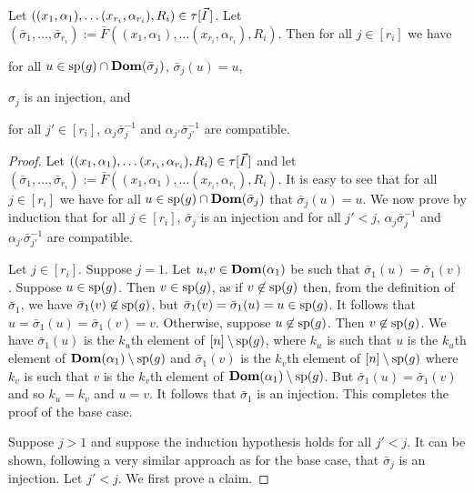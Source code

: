 \documentclass[../main/thesis.tex]{subfiles}
\begin{document}
\begin{lem}
  Let $((x_1, \alpha_1), \ldots (x_{r_i}, \alpha_{r_i}), R_i) \in
  \tau[\vec{I} \,]$. Let $(\bar{\sigma}_1, \ldots, \bar{\sigma}_{r_i})
  := \bar{F}((x_1, \alpha_1), \ldots (x_{r_i}, \alpha_{r_i}), R_i)$. Then for
  all $j \in [r_i]$ we have
  \begin{myenum}
  \item for all $u \in \text{sp}(g) \cap \text{\textbf{Dom}} (\bar{\sigma}_j)$, $\bar{\sigma}_j
    (u) = u$,
  \item $\sigma_j$ is an injection, and
  \item for all $j' \in [r_i]$, $\alpha_j \bar{\sigma}^{-1}_j$ and $\alpha_{j'}
    \bar{\sigma}^{-1}_{j'}$ are compatible.
  \end{myenum}
\end{lem}
\begin{proof}
  Let $((x_1, \alpha_1), \ldots (x_{r_i}, \alpha_{r_i}), R_i) \in
  \tau[\vec{I} \,]$ and let $(\bar{\sigma}_1, \ldots,
  \bar{\sigma}_{r_i}) := \bar{F}((x_1, \alpha_1), \ldots (x_{r_i},
  \alpha_{r_i}), R_i)$. It is easy to see that for all $j \in [r_i]$ we have for
  all $u \in \text{sp}(g) \cap \text{\textbf{Dom}} (\bar{\sigma}_j)$ that $\bar{\sigma}_j (u) =
  u$. We now prove by induction that for all $j \in [r_i]$, $\bar{\sigma}_j$ is
  an injection and for all $j' < j$, $\alpha_j \bar{\sigma}^{-1}_j$ and
  $\alpha_{j'} \bar{\sigma}^{-1}_{j'}$ are compatible.

  Let $j \in [r_i]$. Suppose $j = 1$. Let $u, v \in \text{\textbf{Dom}}(\alpha_1)$ be such that
  $\bar{\sigma}_1(u) = \bar{\sigma}_1(v)$. Suppose $u \in \text{sp}(g)$. Then $v
  \in \text{sp}(g)$, as if $v \not\in \text{sp}(g)$ then, from the definition of
  $\bar{\sigma}_1$, we have $\bar{\sigma}_1 (v) \not\in \text{sp}(g)$, but
  $\bar{\sigma}_1(v) = \bar{\sigma}_1(u) = u \in \text{sp}(g)$. It follows that $u
  = \bar{\sigma}_1(u) = \bar{\sigma}_1(v) = v$. Otherwise, suppose $u \not\in
  \text{sp}(g)$. Then $v \not\in \text{sp}(g)$. We have $\bar{\sigma}_1(u)$ is the
  $k_u$th element of $[n] \setminus \text{sp}(g)$, where $k_u$ is such that $u$ is
  the $k_u$th element of $\text{\textbf{Dom}}(\alpha_1) \setminus \text{sp}(g)$ and
  $\bar{\sigma}_1(v)$ is the $k_v$th element of $[n] \setminus \text{sp}(g)$ where
  $k_v$ is such that $v$ is the $k_v$th element of $\text{\textbf{Dom}}(\alpha_1) \setminus
  \text{sp}(g)$. But $\bar{\sigma}_1(u) = \bar{\sigma}_1 (v)$ and so $k_u = k_v$
  and $u = v$. It follows that $\bar{\sigma}_1$ is an injection. This completes
  the proof of the base case.

  Suppose $j > 1$ and suppose the induction hypothesis holds for all $j' < j$.
  It can be shown, following a very similar approach as for the base case, that
  $\bar{\sigma}_j$ is an injection. Let $j' < j$. We first prove a claim.
  

\end{proof}
\end{document}
